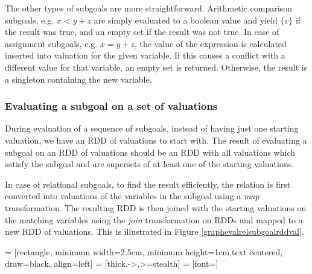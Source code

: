 The other types of subgoals are more straightforward. Arithmetic comparison subgoals, e.g. $x < y + z$ are simply evaluated to a boolean value and yield $\{v\}$ if the result was true, and an empty set if the result was not true. In case of assignment subgoals, e.g. $x = y + z$, the value of the expression is calculated inserted into valuation for the given variable. If this causes a conflict with a different value for that variable, an empty set is returned. Otherwise, the result is a singleton containing the new variable.

\subsubsection{Evaluating a subgoal on a set of valuations}
During evaluation of a sequence of subgoals, instead of having just one starting valuation, we have an RDD of valuations to start with. The result of evaluating a subgoal on an RDD of valuations should be an RDD with all valuations which satisfy the subgoal and are supersets of at least one of the starting valuations.

In case of relational subgoals, to find the result efficiently, the relation is first converted into valuations of the variables in the subgoal using a \emph{map} transformation. The resulting RDD is then joined with the starting valuations on the matching variables using the \emph{join} transformation on RDDs and mapped to a new RDD of valuations. This is illustrated in Figure \ref{graphevalrelsubgoalrddval}.

 = [rectangle, minimum width=2.5cm, minimum height=1cm,text centered, draw=black, align=left]
 = [thick,->,>=stealth]
 = [font=\scriptsize]

